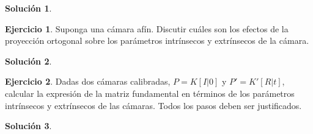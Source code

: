 \documentclass[a4paper, 11pt]{article}
\theoremstyle{definition}
\newtheorem{ejercicio}{Ejercicio}
\newtheorem*{solucion}{Solución}
\theoremstyle{theorem}
\begin{document}
    \begin{solucion}

    \end{solucion}

    \begin{ejercicio}
        Suponga una cámara afín. Discutir cuáles son los efectos de la proyección ortogonal sobre los parámetros intrínsecos y extrínsecos de la cámara.
    \end{ejercicio}

    \begin{solucion}

    \end{solucion}

    \begin{ejercicio}
        Dadas dos cámaras calibradas, $P=K[I|0]$ y $P'=K'[R|t]$, calcular la expresión de la matriz fundamental en términos de los parámetros intrínsecos y extrínsecos de las cámaras. Todos los pasos deben ser justificados.
    \end{ejercicio}

    \begin{solucion}

    \end{solucion}
\end{document}
